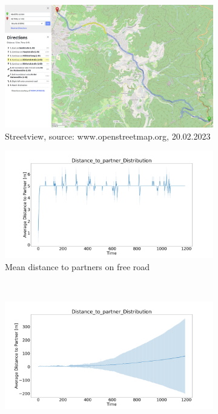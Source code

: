 \begin{figure}[H]
	\centering
	\begin{subfigure}[b]{0.45\textwidth}
		\centering
		\includegraphics[width=1.0\linewidth]{images/Sandstrase/Sandstrase.png}
		\caption{Streetview, source: www.openstreetmap.org, 20.02.2023}
	\end{subfigure}
	\hfill
	\begin{subfigure}[b]{0.45\textwidth}
		\centering
		\includegraphics[width=1.0\textwidth]{images/Sandstrase/Sandstrase_AVG_Distance_to_partner_distribution_free.png}
		\caption{Mean distance to partners on free road}
	\end{subfigure}
	\\
	\begin{subfigure}[b]{0.45\textwidth}
		\centering
		\includegraphics[width=1.0\textwidth]{images/Sandstrase/Sandstrase_AVG_Distance_to_partner_distribution_congested.png}

\end{subfigure}
\end{figure}
